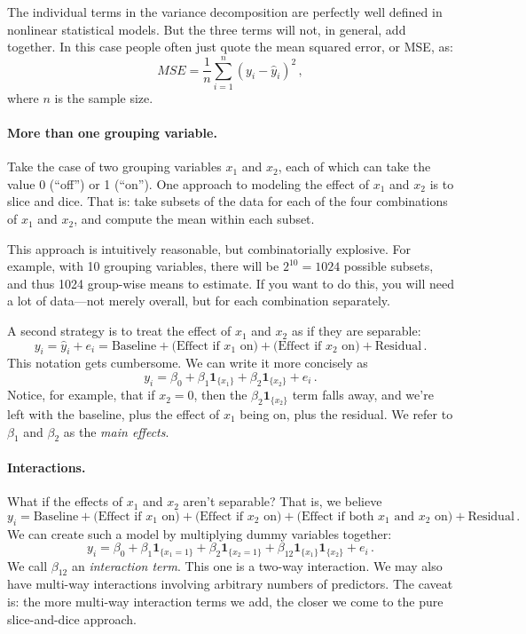 \documentclass[11pt]{article}
\newcommand{\1}[1]{\mathbf{1}_{\{ {#1} \}}}
\begin{document}
The individual terms in the variance decomposition are perfectly well defined in nonlinear statistical models.  But the three terms will not, in general, add together.  In this case people often just quote the mean squared error, or MSE, as:
$$
MSE = \frac{1}{n} \sum_{i=1}^n (y_i - \hat{y}_i)^2 \, ,
$$
where $n$ is the sample size.


\paragraph{More than one grouping variable.}  Take the case of two grouping variables $x_1$ and $x_2$, each of which can take the value $0$ (``off'') or 1 (``on'').  One approach to modeling the effect of $x_1$ and $x_2$ is to slice and dice.  That is: take subsets of the data for each of the four combinations of $x_1$ and $x_2$, and compute the mean within each subset.

This approach is intuitively reasonable, but combinatorially explosive.  For example, with 10 grouping variables, there will be $2^{10} = 1024$ possible subsets, and thus 1024 group-wise means to estimate.  If you want to do this, you will need a lot of data---not merely overall, but for each combination separately.

A second strategy is to treat the effect of $x_1$ and $x_2$ as if they are separable:
$$
y_i = \hat{y}_i + e_i = \mbox{Baseline} + \mbox{(Effect if $x_1$ on)} +  \mbox{(Effect if $x_2$ on)} +  \mbox{Residual} \, .
$$
This notation gets cumbersome.  We can write it more concisely as
$$
y_i = \beta_0 + \beta_1 \1{x_1} + \beta_2 \1{x_2} + e_i \, .
$$
Notice, for example, that if $x_2=0$, then the $\beta_2 \1{x_2}$ term falls away, and we're left with the baseline, plus the effect of $x_1$ being on, plus the residual.  We refer to $\beta_1$ and $\beta_2$ as the \textit{main effects}.

\paragraph{Interactions.}

What if the effects of $x_1$ and $x_2$ aren't separable?  That is, we believe
$$
y_i = \mbox{Baseline} + \mbox{(Effect if $x_1$ on)} +  \mbox{(Effect if $x_2$ on)} + \mbox{(Effect if both $x_1$ and $x_2$ on)} +  \mbox{Residual} \, .
$$
We can create such a model by multiplying dummy variables together:
$$
y_i = \beta_0 + \beta_1 \1{x_1=1} + \beta_2 \1{x_2=1}+ \beta_{12} \1{x_1} \1{x_2} + e_i \, .
$$
We call $\beta_{12}$ an \textit{interaction term}.  This one is a two-way interaction.  We may also have multi-way interactions involving arbitrary numbers of predictors.  The caveat is: the more multi-way interaction terms we add, the closer we come to the pure slice-and-dice approach.
\end{document}
